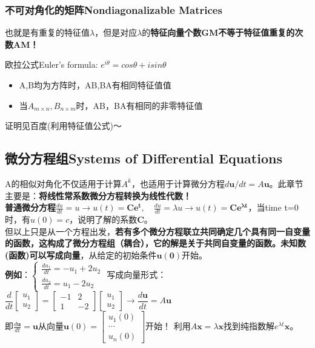     \subsubsection{不可对角化的矩阵Nondiagonalizable Matrices}
    也就是有重复的特征值$\lambda$，但是对应$\lambda$的\textbf{特征向量个数GM不等于特征值重复的次数AM！}

    欧拉公式Euler's formula: $e^{i\theta} = cos\theta + isin\theta$
    \begin{itemize}
        \item A,B均为方阵时，AB,BA有相同特征值值
        \item 当$A_{m\times n}, B_{n\times m}$时，AB，BA有相同的非零特征值
    \end{itemize}
    证明见百度(利用特征值公式)～

    \subsection{微分方程组Systems of Differential Equations}
    A的相似对角化不仅适用于计算$A^k$，也适用于计算微分方程$d\bm{u}/dt = A\bm{u}$。此章节主要是：\textbf{将线性常系数微分方程转换为线性代数！}
    \\
    \textbf{普通微分方程}$\frac{du}{dt} = u \rightarrow u(t)=\bm{Ce^t}, \quad \frac{du}{dt} = \lambda u \rightarrow u(t)=\bm{Ce^{\lambda t}}$，当time t=0时，有$u(0)=c$，说明了解的系数$\bm{C}$。
    \\
    但以上只是从一个方程出发，\textbf{若有多个微分方程联立共同确定几个具有同一自变量的函数，这构成了微分方程组（耦合），它的解是关于共同自变量的函数。未知数(函数)可以写成向量}，从给定的初始条件$\bm{u(0)}$开始。
    \\
    \textbf{例如}：$\left\{\begin{array}{l} \frac{du_1}{dt}=-u_1+2u_2 \\ \frac{du_2}{dt}=u_1-2u_2 \end{array}\right.$ 写成向量形式：$\dfrac{d}{dt} \begin{bmatrix}u_1 \\ u_2 \end{bmatrix}=\begin{bmatrix}-1 & 2 \\ 1 & -2 \end{bmatrix}\begin{bmatrix}u_1 \\ u_2 \end{bmatrix} \rightarrow \dfrac{d\bm{u}}{dt}=A\bm{u}$
    \\
    即$\frac{d\bm{u}}{dt}= \bm{u}$从向量$\bm{u}(0)=\begin{bmatrix} u_{1}(0) \\ \cdots \\ u_{n}(0) \end{bmatrix}$开始！
    利用$A \boldsymbol{x}=\lambda \boldsymbol{x}$找到纯指数解$e^{\lambda t} \bm{x}$。

